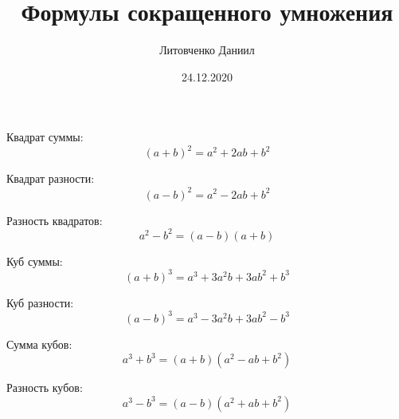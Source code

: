 \documentclass[a4paper,12pt]{article} %
\author{Литовченко Даниил}
\title{Формулы сокращенного умножения}
\date{24.12.2020}
\begin{document}
\maketitle

Квадрат суммы:
\begin{equation}
  {(a + b)}^2 = a^2 + 2ab + b^2
  \label{ssum}
\end{equation}

Квадрат разности:
\begin{equation}
  {(a - b)}^2 = a^2 - 2ab + b^2
  \label{sdif}
\end{equation}

Разность квадратов:
\begin{equation}
  a^2 - b^2 = (a - b) (a + b)
  \label{dsqr}
\end{equation}

Куб суммы:
\begin{equation}
  {(a + b)}^3 = a^3 + 3a^2 b + 3a b^2 + b^3
  \label{csum}
\end{equation}

Куб разности:
\begin{equation}
  {(a - b)}^3 = a^3 - 3a^2 b + 3a b^2 - b^3
  \label{cdif}
\end{equation}

Сумма кубов:
\begin{equation}
  a^3 + b^3 = (a + b) (a^2 - ab + b^2)
  \label{scub}
\end{equation}

Разность кубов:
\begin{equation}
  a^3 - b^3 = (a - b) (a^2 + ab + b^2)
  \label{dcub}
\end{equation}
\end{document}
